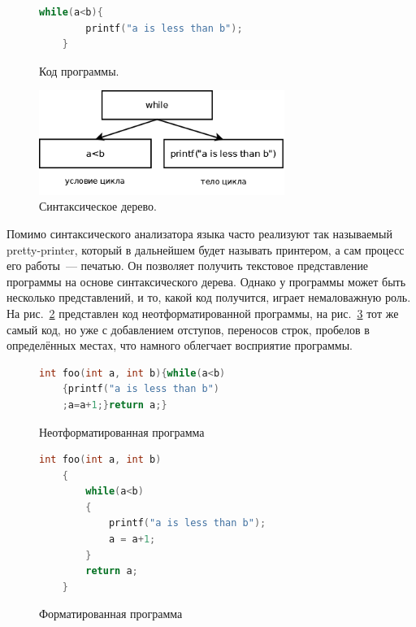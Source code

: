 \begin{figure}[h]
  \begin{minipage}[h]{\textwidth}
    \centering
    \begin{lstlisting}[language=C]
    while(a<b){
        printf("a is less than b");
    }
    \end{lstlisting}
    \caption{Код программы.}
    \label{Code}
  \end{minipage}
  \vskip 3mm
  \begin{minipage}[h]{\textwidth}
    \centering
    \includegraphics[width=8cm]{Aliev/whileTree.png}
    \caption{Синтаксическое дерево.}
    \label{Tree}
  \end{minipage}
\end{figure}

Помимо синтаксического анализатора языка часто реализуют так называемый pretty-printer, 
который в дальнейшем будет называть принтером, а сам процесс его работы~--- печатью. Он позволяет 
получить текстовое представление программы на основе синтаксического дерева. Однако у программы может 
быть несколько представлений, и то, какой код получится, играет немаловажную роль. На рис.~\ref{nonformatted} 
представлен код неотформатированной программы, на рис.~\ref{formatted} тот же самый код, но уже с добавлением 
отступов, переносов строк, пробелов в определённых местах, что намного облегчает восприятие программы.

\begin{figure}[h]
\centering
\begin{lstlisting}[language=C]
    int foo(int a, int b){while(a<b)
    {printf("a is less than b")
    ;a=a+1;}return a;}
\end{lstlisting}
\caption{Неотформатированная программа}
\label{nonformatted}
\end{figure}

\begin{figure}[h]
\centering
\begin{lstlisting}[language=C]
    int foo(int a, int b)
    {
        while(a<b)
        {
            printf("a is less than b");
            a = a+1;
        }
        return a;
    }    
\end{lstlisting}
\caption{Форматированная программа}
\label{formatted}
\end{figure}

